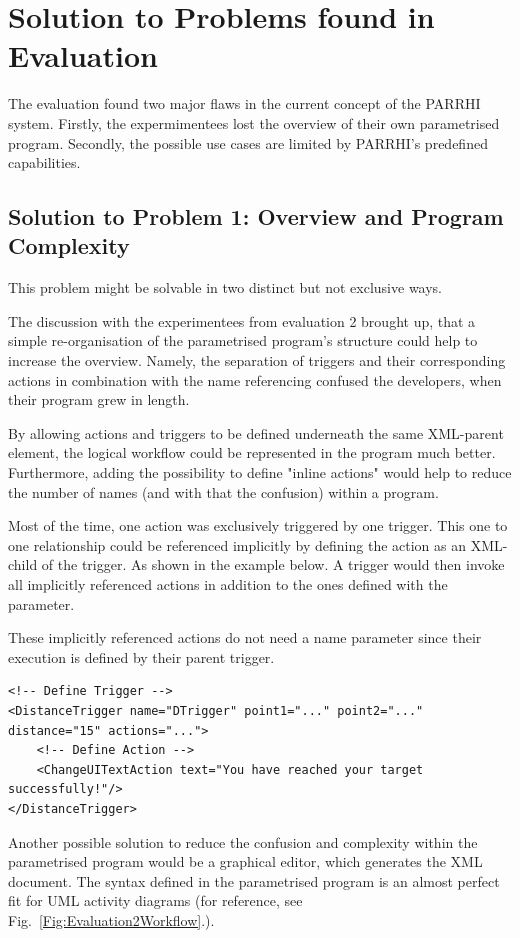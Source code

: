 \section{Solution to Problems found in Evaluation}\label{Section:SolutionToEval}
 
The evaluation found two major flaws in the current concept of the PARRHI system. Firstly, the expermimentees lost the overview of their own parametrised program. Secondly, the possible use cases are limited by PARRHI's predefined capabilities.

\subsection{Solution to Problem 1: Overview and Program Complexity}
This problem might be solvable in two distinct but not exclusive ways.

The discussion with the experimentees from evaluation 2 brought up, that a simple re-organisation of the parametrised program's structure could help to increase the overview. Namely, the separation of triggers and their corresponding actions in combination with the name referencing confused the developers, when their program grew in length.

By allowing actions and triggers to be defined underneath the same XML-parent element, the logical workflow could be represented in the program much better. Furthermore, adding the possibility to define "inline actions" would help to reduce the number of names (and with that the confusion) within a program.

Most of the time, one action was exclusively triggered by one trigger. This one to one relationship could be referenced implicitly by defining the action as an XML-child of the trigger. As shown in the example below. A trigger would then invoke all implicitly referenced actions in addition to the ones defined with the  parameter.

These implicitly referenced actions do not need a name parameter since their execution is defined by their parent trigger.

\begin{lstlisting}
<!-- Define Trigger -->
<DistanceTrigger name="DTrigger" point1="..." point2="..." distance="15" actions="...">
	<!-- Define Action -->
	<ChangeUITextAction text="You have reached your target successfully!"/>
</DistanceTrigger>
\end{lstlisting}

Another possible solution to reduce the confusion and complexity within the parametrised program would be a graphical editor, which generates the XML document. The syntax defined in the parametrised program is an almost perfect fit for UML activity diagrams (for reference, see Fig.~\ref{Fig:Evaluation2Workflow}.).

